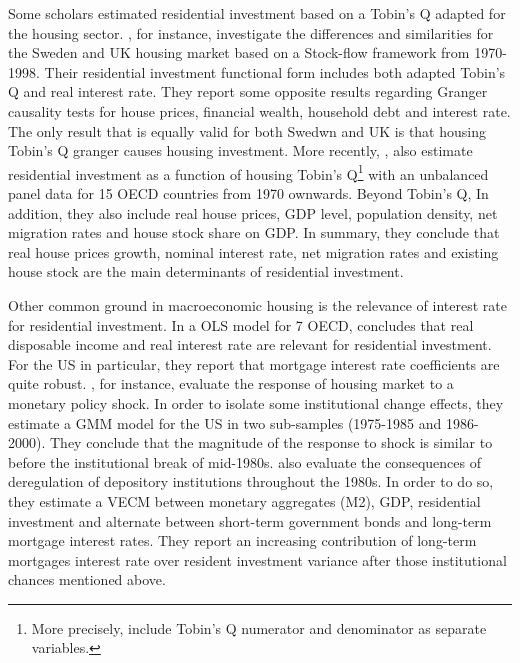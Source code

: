 \documentclass[12pt, a4paper]{article}
\begin{document}
Some scholars estimated residential investment based on a Tobin's Q adapted for the housing sector.
\textcite{barot_2002_House}, for instance, investigate the differences and similarities for the Sweden and UK housing market based on a Stock-flow framework from 1970-1998.
Their residential investment functional form includes both adapted Tobin's Q and real interest rate.
They report some opposite results regarding Granger causality tests for house prices, financial wealth, household debt and interest rate.
The only result that is equally valid for both Swedwn and UK is that housing Tobin's Q granger causes housing investment.
More recently, \textcite{kohlscheen_2018_Residential}, also estimate residential investment as a function of housing Tobin's Q\footnote{More precisely, \textcite{kohlscheen_2018_Residential} include Tobin's Q numerator and denominator as separate variables.} with an unbalanced panel data for 15 OECD countries from 1970 ownwards.
Beyond Tobin's Q, In addition, they also include real house prices, GDP level, population density, net migration rates and house stock share on GDP.
In summary, they conclude that real house prices growth, nominal interest rate, net migration rates and existing house stock are the main determinants of residential investment.

Other common ground in macroeconomic housing is the relevance of interest rate for residential investment.
In a OLS model for 7 OECD, \textcite{egebo_1990_MODEL} concludes that real disposable income and real interest rate are relevant for residential investment.
For the US in particular, they report that mortgage interest rate coefficients are quite robust.
\textcite{mccarthyMonetaryPolicyTransmission2002}, for instance, evaluate the response of housing market to a monetary policy shock.
In order to isolate some institutional change effects, they estimate a GMM model for the US in two sub-samples (1975-1985 and 1986-2000).
They conclude that the magnitude of the response to shock is similar to before the institutional break of mid-1980s.
\textcite{gauger_residential_2003} also evaluate the consequences of deregulation of depository institutions throughout the 1980s.
In order to do so, they estimate a VECM between monetary aggregates (M2), GDP, residential investment and alternate between short-term government bonds and long-term mortgage interest rates.
They report an increasing contribution of long-term mortgages interest rate over resident investment variance after those institutional chances mentioned above.
\end{document}
